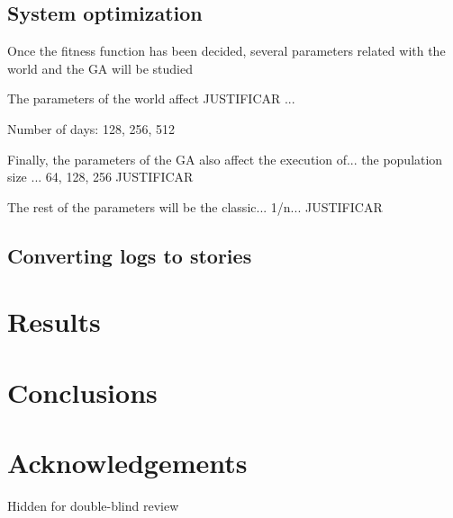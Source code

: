 \documentclass[runningheads,a4paper]{llncs}
\begin{document}
\subsection{System optimization}

Once the fitness function has been decided, several parameters related with the world and the GA will be studied

The parameters of the world affect  JUSTIFICAR ...


Number of days: 128, 256, 512


Finally, the parameters of the GA also affect the execution of... the population size ... 64, 128, 256 JUSTIFICAR

The rest of the parameters will be the classic... 1/n... JUSTIFICAR 


\subsection{Converting logs to stories}

\section{Results}
\label{sec:res}

\section{Conclusions}

\section*{Acknowledgements}

Hidden for double-blind review



\end{document}
